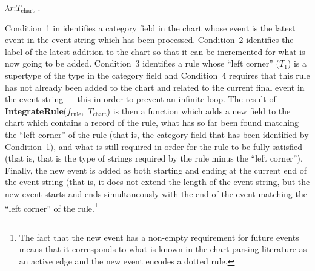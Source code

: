 \begin{ex}
$\lambda r$:$T_{\mathrm{chart}}$ . \\
\hspace*{1em}

\end{ex}

Condition~1 in \preveg{} identifies a category field in the chart
whose event is the latest event in the event string which has been
processed.  Condition~2 identifies the label of the latest addition to
the chart so that it can be incremented for what is now going to be
added.  Condition~3 identifies a rule whose ``left corner'' ($T_1$) is
a supertype of the type in the category field and Condition~4 requires
that this rule has not already been added to the chart and related to
the current final event in the event string --- this in order to
prevent an infinite loop.  The result of
\mbox{\textbf{IntegrateRule}($f_{\mathrm{rule}}$, $T_{\mathrm{chart}}$)} is
then a function which adds a new field to the chart which contains a
record of the rule, what has so far been found matching the ``left
corner'' of the rule (that is, the category field that has been
identified by Condition~1), and what is still required in order for the
rule to be fully satisfied (that is, that is the type of strings
required by the rule minus the ``left corner'').  Finally, the new
event is added as both starting and ending at the current end of the
event string (that is, it does not extend the length of the event
string, but the new event starts and ends simultaneously with the end
of the event matching the ``left corner'' of the rule.\footnote{The fact that
the new event has a non-empty requirement for future events means that
it corresponds to what is known in the chart parsing literature as an
active edge and the new event encodes a dotted rule.}

